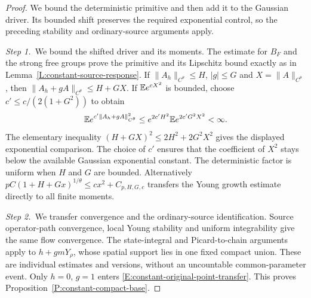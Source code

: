 \begin{proof}
  We bound the deterministic primitive and then add it to the Gaussian driver.
  Its bounded shift preserves the required exponential control, so the
  preceding stability and ordinary-source arguments apply.

  \medskip
  \noindent\textit{Step 1.~}We bound the shifted driver and its moments.
  The estimate for $B_F$ and the strong free groups prove the primitive and its
  Lipschitz bound exactly as in Lemma~\ref{L:constant-source-response}. If
  $\|A_h\|_{C^\theta} \le H$, $|g| \le G$ and $X = \|A\|_{C^\theta}$, then
  $\|A_h+gA\|_{C^\theta} \le H+GX$. If $\mathbb{E} e^{cX^2}$ is bounded, choose $c' \le
  c/(2(1+G^2))$ to obtain
  \[
    \mathbb{E} e^{c'\|A_h+gA\|_{C^\theta}^2}
    \le e^{2c'H^2}\mathbb{E} e^{2c'G^2X^2}<\infty.
  \]
  The elementary inequality $(H+GX)^2 \le 2H^2+2G^2X^2$ gives the displayed
  exponential comparison. The choice of $c'$ ensures that the coefficient of
  $X^2$ stays below the available Gaussian exponential constant. The
  deterministic factor is uniform when $H$ and $G$ are bounded.
  Alternatively $pC(1+H+Gx)^{1/\theta} \le cx^2+C_{p,H,G,c}$ transfers the Young
  growth estimate directly to all finite moments.

  \medskip
  \noindent\textit{Step 2.~}We transfer convergence and the ordinary-source
  identification.
  Source operator-path convergence, local Young stability and uniform
  integrability give the same
  flow convergence. The state-integral and Picard-to-chain arguments apply to
  $h+gmY_\rho$, whose spatial support lies in one fixed compact union. These are
  individual estimates and versions, without an uncountable common-parameter
  event. Only $h = 0$, $g = 1$ enters
  \eqref{E:constant-original-point-transfer}. This proves
  Proposition~\ref{P:constant-compact-base}.
\end{proof}
